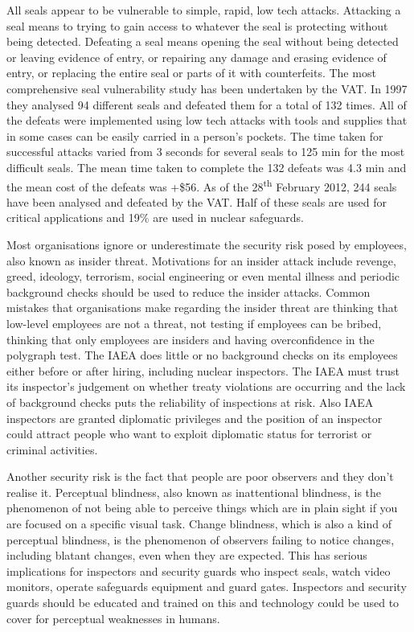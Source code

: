 \documentclass[twoside,titlepage,11pt,twocolumn,a4paper]{article}
\begin{document}
All seals appear to be vulnerable to simple, rapid, low tech 
attacks. Attacking a seal means to trying to gain access to whatever
the seal is protecting without being detected. Defeating a seal means
opening the seal without being detected or leaving evidence of entry,
or repairing any damage and erasing evidence of entry, or replacing
the entire seal or parts of it with counterfeits. The most
comprehensive seal vulnerability study has been undertaken by the
VAT. In 1997 they analysed 94 different seals and defeated them for a
total of 132 times. All of the defeats were implemented using low tech
attacks with tools and supplies that in some cases can be easily
carried in a person's pockets. The time taken for successful attacks
varied from 3 seconds for several seals to 125 min for the most
difficult seals. The mean time taken to complete the 132 defeats was
4.3 min and the mean cost of the defeats was +\$56. \citep{vulnSecSeals1997} 
As of the 28\textsuperscript{th} February 2012, 244 seals have been 
analysed and defeated by the VAT. Half of these seals are used for
critical applications and 19\% are used in nuclear safeguards. \citep{VAT}

Most organisations ignore or underestimate the security risk posed by
employees, also known as insider threat.
\citep{nuclearSafeguardsAndSec2005} Motivations for an insider attack
include revenge, greed, ideology, terrorism, social engineering or
even mental illness and periodic background checks should be used to
reduce the insider attacks. Common mistakes that organisations make
regarding the insider threat are thinking that low-level employees are
not a threat, not testing if employees can be bribed, thinking that
only employees are insiders and having overconfidence in the polygraph
test. \citep{insiderThreat2011} The IAEA does little or no background
checks on its employees either before or after hiring, including
nuclear inspectors. The IAEA must trust its inspector’s judgement on
whether treaty violations are occurring and the lack of background
checks puts the reliability of inspections at risk. Also IAEA
inspectors are granted diplomatic privileges and the position of an
inspector could attract people who want to exploit diplomatic status
for terrorist or criminal
activities. \citep{nuclearSafeguardsAndSec2005}

Another security risk is the fact that people are poor observers and
they don't realise it. Perceptual blindness, also known as
inattentional blindness, is the phenomenon of not being able to
perceive things which are in plain sight if you are focused on a
specific visual task. Change blindness, which is also a kind of
perceptual blindness, is the phenomenon of observers failing to notice
changes, including blatant changes, even when they are expected. This
has serious implications for inspectors and security guards who
inspect seals, watch video monitors, operate safeguards equipment and
guard gates. Inspectors and security guards should be educated and
trained on this and technology could be used to cover for perceptual
weaknesses in humans. \citep{insiderThreat2011}
\end{document}
